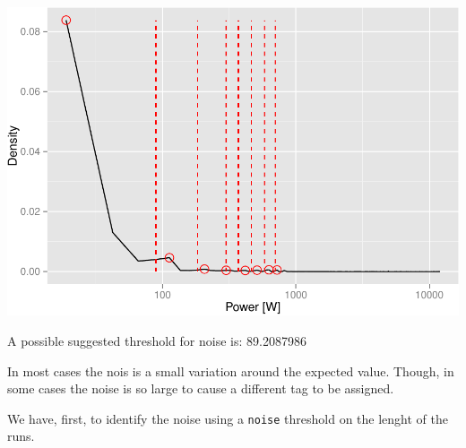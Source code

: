 \documentclass[]{article}
\newenvironment{Shaded}{\begin{snugshade}}{\end{snugshade}}
\newcommand{\KeywordTok}[1]{\textcolor[rgb]{0.13,0.29,0.53}{\textbf{{#1}}}}
\newcommand{\DecValTok}[1]{\textcolor[rgb]{0.00,0.00,0.81}{{#1}}}
\newcommand{\StringTok}[1]{\textcolor[rgb]{0.31,0.60,0.02}{{#1}}}
\newcommand{\NormalTok}[1]{{#1}}
\begin{document}
\begin{Shaded}
\end{Shaded}

\includegraphics{AnalysisProcedure_files/figure-latex/noise_density-1.pdf}

A possible suggested threshold for noise is: 89.2087986

In most cases the nois is a small variation around the expected value.
Though, in some cases the noise is so large to cause a different tag to
be assigned.

We have, first, to identify the noise using a \texttt{noise} threshold
on the lenght of the runs.
\end{document}
